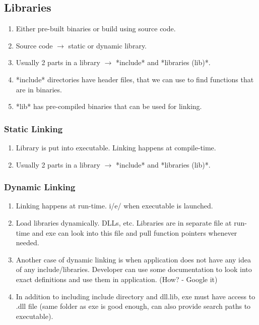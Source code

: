 \documentclass{article}
\begin{document}
    \subsection{Libraries}
        \begin{enumerate}
            \item Either pre-built binaries or build using source code. 
            \item Source code $\rightarrow$ static or dynamic library. 
            \item Usually 2 parts in a library $\rightarrow$ *include* and *libraries (lib)*.
            \item *include* directories have header files, that we can use to find functions that are in binaries.
            \item *lib* has pre-compiled binaries that can be used for linking.
        \end{enumerate}
    
        \subsubsection{Static Linking}
            \begin{enumerate}
                \item Library is put into executable. Linking happens at compile-time.     \item Usually 2 parts in a library $\rightarrow$ *include* and     *libraries (lib)*.
            \end{enumerate}
            
        \subsubsection{Dynamic Linking}
            \begin{enumerate}
                \item Linking happens at run-time. i/e/ when executable is launched.
                \item Load libraries dynamically. DLLs, etc. Libraries are in separate file at run-time and exe can look into this file and pull function pointers whenever needed.
                \item Another case of dynamic linking is when application does not have any idea of any include/libraries. Developer can use some documentation to look into exact definitions and use them in application. (How? - Google it)
                \item In addition to including include directory and dll.lib, exe must have access to .dll file (same folder as exe is good enough, can also provide search paths to executable). 
            \end{enumerate}
            
\end{document}
